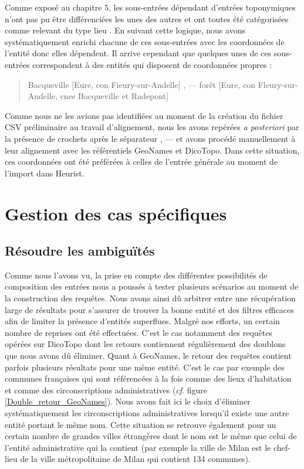 \documentclass[a4paper,12pt,twoside]{book}
\begin{document}
	Comme exposé au chapitre 5, les sous-entrées dépendant d'entrées toponymiques n'ont pas pu être différenciées les unes des autres et ont toutes été catégorisées comme relevant du type \og lieu \fg{}. En suivant cette logique, nous avons systématiquement enrichi chacune de ces sous-entrées avec les coordonnées de l'entité donc elles dépendent. Il arrive cependant que quelques unes de ces sous-entrées correspondent à des entités qui disposent de coordonnées propres :
	
	\begin{quotation}
		Bacqueville [Eure, con Fieury-sur-Andelle] , — forêt [Eure, con
		Fleury-sur-Andelle, cnes Bacqueville et Radepont]
	\end{quotation}
	
	Comme nous ne les avions pas identifiées au moment de la création du fichier CSV préliminaire au travail d'alignement, nous les avons repérées \textit{a posteriori} par la présence de crochets après le séparateur \og , — \fg{} et avons procédé manuellement à leur alignement avec les référentiels GeoNames et DicoTopo. Dans cette situation, ces coordonnées ont été préférées à celles de l'entrée générale au moment de l'import dans Heurist.
	
	\section{Gestion des cas spécifiques}
	
	\subsection{Résoudre les ambiguïtés}
	
	Comme nous l'avons vu, la prise en compte des différentes possibilités de composition des entrées nous a poussés à tester plusieurs scénarios au moment de la construction des requêtes. Nous avons ainsi dû arbitrer entre une récupération large de résultats pour s'assurer de trouver la bonne entité et des filtres efficaces afin de limiter la présence d'entités superflues. Malgré nos efforts, un certain nombre de reprises ont été effectuées. C'est le cas notamment des requêtes opérées sur DicoTopo dont les retours contiennent régulièrement des doublons que nous avons dû éliminer. Quant à GeoNames, le retour des requêtes contient parfois plusieurs résultats pour une même entité. C'est le cas par exemple des communes françaises qui sont référencées à la fois comme des lieux d'habitation et comme des circonscriptions administratives (\textit{cf}. figure \ref{Double_retour_GeoNames}). Nous avons fait ici le choix d'éliminer systématiquement les circonscriptions administratives lorsqu'il existe une autre entité portant le même nom. Cette situation se retrouve également pour un certain nombre de grandes villes étrangères dont le nom est le même que celui de l'entité administrative qui la contient (par exemple la ville de Milan est le chef-lieu de la ville métropolitaine de Milan qui contient 134 communes).
	
\end{document}

